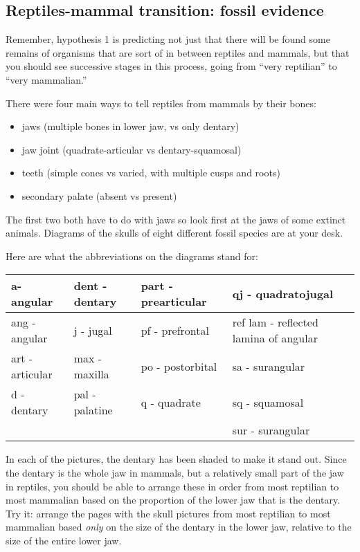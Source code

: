 \documentclass[12pt, hidelinks]{exam}
\begin{document}
\subsection*{Reptiles-mammal transition: fossil evidence}


Remember, hypothesis 1 is
predicting not just that there will be found some remains of organisms
that are sort of in between reptiles and mammals, but that you should see
successive stages in this process, going from ``very reptilian'' to
``very mammalian.''

There were four main ways to tell reptiles from mammals by their bones:

\begin{itemize}
\item
  jaws (multiple bones in lower jaw, vs only dentary)
\item
  jaw joint (quadrate-articular vs dentary-squamosal)
\item
  teeth (simple cones vs varied, with multiple cusps and roots)
\item
  secondary palate (absent vs present)
\end{itemize}

The first two both have to do with jaws so look first at the jaws of
some extinct animals. Diagrams of the skulls of eight different fossil species are at your
desk.

Here are what the abbreviations on the diagrams stand for:

\begin{longtable}[c]{@{}L{0.22\textwidth}L{0.22\textwidth}L{0.22\textwidth}L{0.22\textwidth}@{}}
\toprule
a- angular & dent -dentary & part - prearticular & qj -
quadratojugal\tabularnewline
\midrule
\endhead
ang - angular & j - jugal & pf - prefrontal & ref lam - reflected lamina
of angular\tabularnewline
art - articular & max - maxilla & po - postorbital & sa -
surangular\tabularnewline
d - dentary & pal - palatine & q - quadrate & sq -
squamosal\tabularnewline
& & & sur - surangular\tabularnewline
\bottomrule
\end{longtable}

In each of the pictures, the dentary has been shaded to make it stand
out. Since the dentary is the whole jaw in mammals, but a relatively
small part of the jaw in reptiles, you should be able to arrange these
in order from most reptilian to most mammalian based on the proportion
of the lower jaw that is the dentary. Try it: arrange the pages with the
skull pictures from most reptilian to most mammalian based \emph{only} on the
size of the dentary in the lower jaw, relative to the size of the entire
lower jaw.
\end{document}
